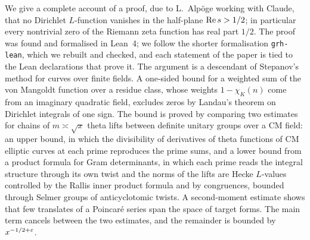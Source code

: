 We give a complete account of a proof, due to L.~Alp\"oge working with Claude, that no Dirichlet
$L$-function vanishes in the half-plane $\operatorname{Re} s>1/2$; in particular every nontrivial zero of the Riemann
zeta function has real part $1/2$. The proof was found and formalised in Lean~4;
we follow the shorter formalisation \texttt{grh-lean}, which we rebuilt and checked, and
each statement of the paper is tied to the Lean declarations that prove it. The argument is a
descendant of Stepanov's method for curves over finite fields. A one-sided bound for a weighted sum
of the von Mangoldt function over a residue class, whose weights $1-\chi_K(n)$ come from an imaginary
quadratic field, excludes zeros by Landau's theorem on Dirichlet integrals of one sign. The bound is
proved by comparing two estimates for chains of $m\asymp\sqrt x$ theta lifts between definite unitary
groups over a CM field: an upper bound, in which the divisibility of derivatives of theta functions of
CM elliptic curves at each prime reproduces the prime sums, and a lower bound from a product formula
for Gram determinants, in which each prime reads the integral structure through its own twist and the
norms of the lifts are Hecke $L$-values controlled by the Rallis inner product formula and by
congruences, bounded through Selmer groups of anticyclotomic twists. A second-moment estimate shows that few translates of a Poincar\'e series span the
space of target forms. The main term cancels between the two estimates, and the remainder is bounded
by $x^{-1/2+\varepsilon}$.
